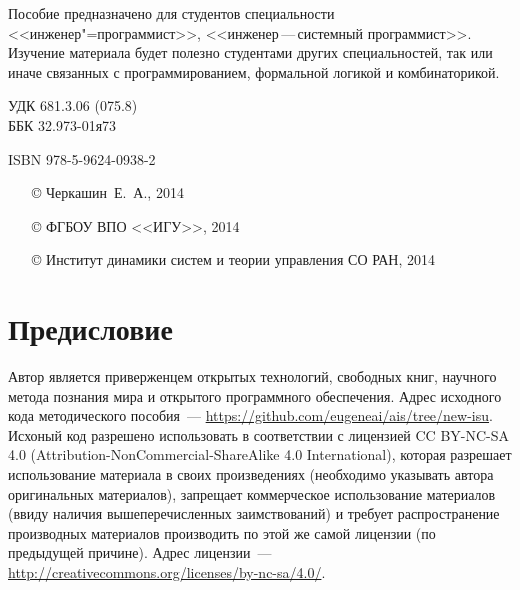 \documentclass[14pt, openany, twoside, final]{extbook} %
\begin{document}
\begin{mygroup}
\begin{minipage}[t]{0.95\linewidth}
    Пособие предназначено для студентов специальности <<инженер"=программист>>, <<инженер\,---\,системный программист>>. Изучение материала будет полезно студентами других специальностей, так или иначе связанных с программированием, формальной логикой и комбинаторикой.

\mbox{}
\endgroup
\end{minipage}
\mbox{}\hspace{0.7\linewidth}
\begin{minipage}{0.3\linewidth}\small
\noindent УДК 681.3.06 (075.8)\\
\noindent ББК 32.973-01я73
\end{minipage}

\vfill
\noindent\begin{minipage}[t]{0.35\linewidth}\small
\noindent ISBN 978-5-9624-0938-2
\end{minipage}%
\begin{minipage}[t]{0.65\linewidth}\small
\begin{itemize}
\setlength{\itemsep}{-0.5ex}
\setlength{\parsep}{0pt}
\item[\copyright{}] Черкашин~Е.~А., 2014
\item[\copyright{}] ФГБОУ ВПО <<ИГУ>>, 2014
\item[\copyright{}] Институт динамики систем и теории управления СО РАН, 2014
\end{itemize}
\end{minipage}
\end{mygroup}
\clearpage
\tableofcontents
\clearpage

\newpage
\chapter*{Предисловие}



Автор является приверженцем открытых технологий, свободных книг, научного метода познания мира и открытого программного обеспечения. Адрес исходного кода методического пособия~--- \url{https://github.com/eugeneai/ais/tree/new-isu}. Исхоный код разрешено использовать в соответствии с лицензией  \foreignlanguage{english}{CC BY-NC-SA 4.0 (Attribution-NonCommercial-ShareAlike 4.0 International)}, которая разрешает использование материала в своих произведениях (необходимо указывать автора оригинальных материалов), запрещает коммерческое использование материалов (ввиду наличия вышеперечисленных заимствований) и требует распространение производных материалов производить по этой же самой лицензии (по предыдущей причине). Адрес лицензии~---  \url{http://creativecommons.org/licenses/by-nc-sa/4.0/}.
\end{document}
